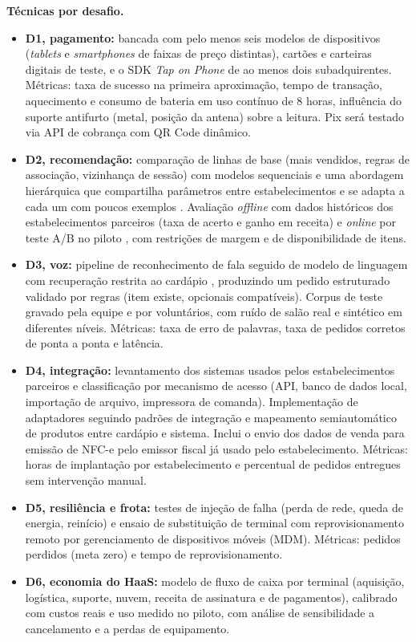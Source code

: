 \documentclass[12pt,a4paper]{article}
\begin{document}
\textbf{Técnicas por desafio.}
\begin{itemize}
    \item \textbf{D1, pagamento:} bancada com pelo menos seis modelos de dispositivos (\textit{tablets} e \textit{smartphones} de faixas de preço distintas), cartões e carteiras digitais de teste, e o SDK \textit{Tap on Phone} de ao menos dois subadquirentes. Métricas: taxa de sucesso na primeira aproximação, tempo de transação, aquecimento e consumo de bateria em uso contínuo de 8 horas, influência do suporte antifurto (metal, posição da antena) sobre a leitura. Pix será testado via API de cobrança com QR Code dinâmico.
    \item \textbf{D2, recomendação:} comparação de linhas de base (mais vendidos, regras de associação, vizinhança de sessão) com modelos sequenciais \cite{hidasi2016, kang2018} e uma abordagem hierárquica que compartilha parâmetros entre estabelecimentos e se adapta a cada um com poucos exemplos \cite{vartak2017, lee2019}. Avaliação \textit{offline} com dados históricos dos estabelecimentos parceiros (taxa de acerto e ganho em receita) e \textit{online} por teste A/B no piloto \cite{kohavi2020}, com restrições de margem e de disponibilidade de itens.
    \item \textbf{D3, voz:} pipeline de reconhecimento de fala \cite{radford2023} seguido de modelo de linguagem com recuperação restrita ao cardápio \cite{lewis2020}, produzindo um pedido estruturado validado por regras (item existe, opcionais compatíveis). Corpus de teste gravado pela equipe e por voluntários, com ruído de salão real e sintético em diferentes níveis. Métricas: taxa de erro de palavras, taxa de pedidos corretos de ponta a ponta e latência.
    \item \textbf{D4, integração:} levantamento dos sistemas usados pelos estabelecimentos parceiros e classificação por mecanismo de acesso (API, banco de dados local, importação de arquivo, impressora de comanda). Implementação de adaptadores seguindo padrões de integração \cite{hohpe2003} e mapeamento semiautomático de produtos entre cardápio e sistema. Inclui o envio dos dados de venda para emissão de NFC-e pelo emissor fiscal já usado pelo estabelecimento. Métricas: horas de implantação por estabelecimento e percentual de pedidos entregues sem intervenção manual.
    \item \textbf{D5, resiliência e frota:} testes de injeção de falha (perda de rede, queda de energia, reinício) e ensaio de substituição de terminal com reprovisionamento remoto por gerenciamento de dispositivos móveis (MDM). Métricas: pedidos perdidos (meta zero) e tempo de reprovisionamento.
    \item \textbf{D6, economia do HaaS:} modelo de fluxo de caixa por terminal (aquisição, logística, suporte, nuvem, receita de assinatura e de pagamentos), calibrado com custos reais e uso medido no piloto, com análise de sensibilidade a cancelamento e a perdas de equipamento.
\end{itemize}
\end{document}
